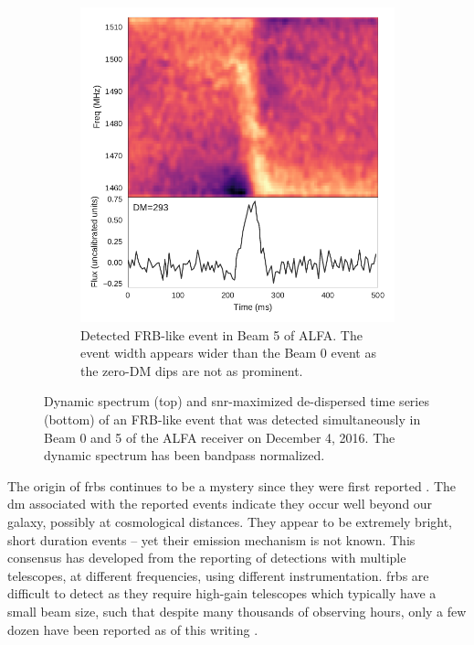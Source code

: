 \documentclass[a4paper,fleqn,usenatbib]{mnras}
\begin{document}
\begin{figure}
\begin{subfigure}[t]{0.45\textwidth}
        \includegraphics[width=1.0\textwidth]{figures/D20161204_buf4_Beam5.pdf}
        \caption{Detected FRB-like event in Beam 5 of ALFA. The event width
        appears wider than the Beam 0 event as the zero-DM dips are not as
        prominent.
        }
        \label{fig:beam5_dynamic_spec}
    \end{subfigure}
    \caption{
    Dynamic spectrum (top) and \gls{snr}-maximized de-dispersed time series
    (bottom) of an FRB-like event that was detected simultaneously in Beam 0 and
    5 of the ALFA receiver on December 4, 2016. The dynamic spectrum has been
    bandpass normalized.
    }
    \label{fig:dynamic_spec}
\end{figure}


The origin of \glspl{frb} continues to be a mystery since they were first
reported \citep{2007Sci...318..777L}. The \gls{dm} associated with the reported
events indicate they occur well beyond our galaxy, possibly at cosmological
distances. They appear to be extremely bright, short duration events -- yet
their emission mechanism is not known.  This consensus has developed from the
reporting of detections with multiple telescopes, at different frequencies,
using different instrumentation. \glspl{frb} are difficult to detect as they
require high-gain telescopes which typically have a small beam size, such that
despite many thousands of observing hours, only a few dozen have been reported
as of this writing \citep{2016PASA...33...45P}.
\end{document}

